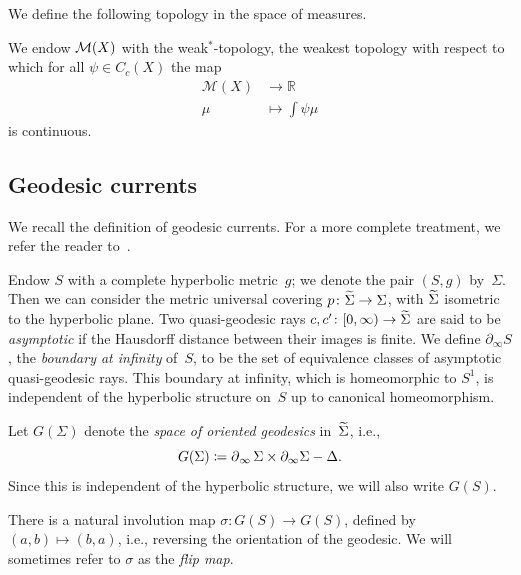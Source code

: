 We define the following topology in the space of measures.

\begin{definition} We endow $\mathcal{M}(X)$ with the weak$^*$-topology, the
  weakest topology with respect to which for all $\psi\in C_c(X)$ the map
\begin{align*}
  \mathcal{M}(X) &\to \mathbb{R}\\
  \mu &\mapsto \int \psi \mu
\end{align*}
is continuous.
\end{definition}

\subsection{Geodesic currents}
\label{sec:currents}
We recall the definition of geodesic currents. For a more complete
treatment, we refer the reader
to~\cite[Chapter~3]{ES22:GeodesicCount}.

\begin{definition}
\label{def:boundaryinfty}
Endow $S$ with a complete
hyperbolic  metric~$g$; we denote the pair $(S,g)$ by~$\Sigma$. Then
we can consider the metric
universal covering $p \colon \widetilde{\Sigma} \to \Sigma$, with
$\widetilde{\Sigma}$ isometric to the hyperbolic plane.
Two quasi-geodesic rays $c,c' \colon [0,\infty) \to \widetilde{\Sigma}$ are
said to be \emph{asymptotic} if the Hausdorff distance between their images is finite.
We define
$\partial_{\infty} S$, the \emph{boundary at infinity}
of~$S$, to be the set of equivalence classes of
asymptotic quasi-geodesic rays. This boundary at infinity, which is homeomorphic to $S^1$, is
independent of the hyperbolic structure on~$S$ up to canonical
homeomorphism.
\end{definition}

\begin{definition}

\label{def:spacegeodesics}
Let $G(\Sigma)$ denote the \emph{space of oriented geodesics} in~$\widetilde{\Sigma}$, i.e.,
\[
G(\Sigma) \coloneqq\operatorname{\partial}_\infty \Sigma  \times\partial_\infty\Sigma - \Delta.
\]
Since this is independent of the hyperbolic structure, we will also
write $G(S)$.
\end{definition}

There is a natural involution map $\sigma \colon G(S) \to G(S)$, defined by $(a,b) \mapsto (b,a)$, i.e., reversing the orientation of the geodesic. We will sometimes refer to $\sigma$ as the \emph{flip map}.

